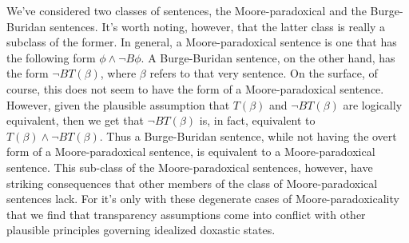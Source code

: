 We've considered two classes of sentences, the Moore-paradoxical and the Burge-Buridan sentences.
It's worth noting, however, that the latter class is really a subclass of the former.
In general, a Moore-paradoxical sentence is one that has the following form $\phi \wedge \lnot B \phi$.
A Burge-Buridan sentence, on the other hand, has the form $\lnot B T(\beta)$, where $\beta$ refers to that very sentence. 
On the surface, of course, this does not seem to have the form of a Moore-paradoxical sentence.
However, given the plausible assumption that $T(\beta)$ and $\lnot B T(\beta)$ are logically equivalent, then we get that $\lnot B T(\beta)$ is, in fact, equivalent to $T(\beta) \wedge \lnot B T(\beta)$.
Thus a Burge-Buridan sentence, while not having the overt form of a Moore-paradoxical sentence, is equivalent to a Moore-paradoxical sentence.
This sub-class of the Moore-paradoxical sentences, however, have striking consequences that other members of the class of Moore-paradoxical sentences lack.
For it's only with these degenerate cases of Moore-paradoxicality that we find that transparency assumptions come into conflict with other plausible principles governing idealized doxastic states.
